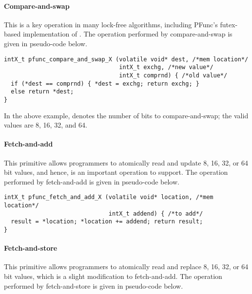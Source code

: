 \paragraph{Compare-and-swap} This is a key operation in many lock-free
algorithms, including PFunc's futex-based implementation of
. 
%
The operation performed by compare-and-swap is given in pseudo-code below.
 
\begin{center}
\begin{minipage}{0.7\textwidth}
\begin{lstlisting}
intX_t pfunc_compare_and_swap_X (volatile void* dest, /*mem location*/
                                 intX_t exchg, /*new value*/
                                 intX_t comprnd) { /*old value*/
  if (*dest == comprnd) { *dest = exchg; return exchg; } 
  else return *dest;
}
\end{lstlisting}
\end{minipage}
\end{center}

In the above example,  denotes the number of bits to compare-and-swap;
the valid values are 8, 16, 32, and 64.

\paragraph{Fetch-and-add} This primitive allows programmers to atomically 
read and update 8, 16, 32, or 64 bit values, and hence, is an important 
operation to support.
%
The operation performed by fetch-and-add is given in pseudo-code below.

\begin{center}
\begin{minipage}{0.7\textwidth}
\begin{lstlisting}
intX_t pfunc_fetch_and_add_X (volatile void* location, /*mem location*/
                              intX_t addend) { /*to add*/
  result = *location; *location += addend; return result;
}
\end{lstlisting}
\end{minipage}
\end{center}

\paragraph{Fetch-and-store} This primitive allows programmers to atomically 
read and replace 8, 16, 32, or 64 bit values, which is a slight modification 
to fetch-and-add.
%
The operation performed by fetch-and-store is given in pseudo-code below.

